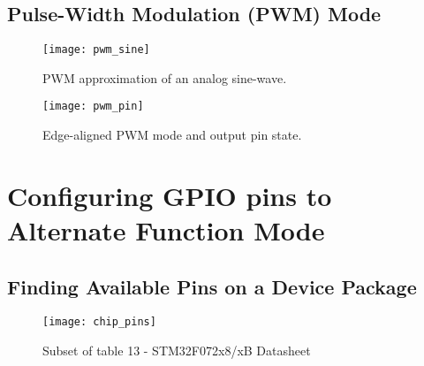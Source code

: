 \documentclass[11pt,fleqn]{book} %
\begin{document}
    
    \subsection{Pulse-Width Modulation (PWM) Mode}
%        
    \begin{figure}[]
        \centering\texttt{[image: pwm\_sine]}
        \caption{PWM approximation of an analog sine-wave.}
        \label{pwm_sine}
    \end{figure}
    
     \begin{figure}[]
        \centering\texttt{[image: pwm\_pin]}
        \caption{Edge-aligned PWM mode and output pin state.}
        \label{pwm_pin}
    \end{figure}

\section{Configuring GPIO pins to Alternate Function Mode}
%    
    
    \subsection{Finding Available Pins on a Device Package}
%    
    \begin{figure}[]
        \centering\texttt{[image: chip\_pins]}
        \caption{Subset of table 13 - STM32F072x8/xB Datasheet}
        \label{chip_pins}
    \end{figure}
\end{document}
